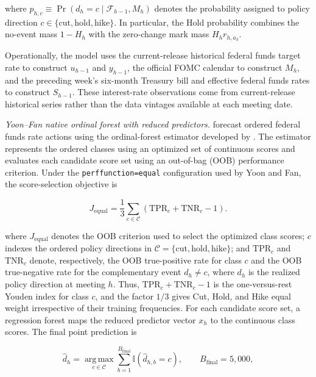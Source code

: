 where
\(p_{h,c}\equiv\Pr(d_h=c\mid\mathcal{F}_{h-1},M_h)\) denotes the probability
assigned to policy direction
\(c\in\{\mathrm{cut},\mathrm{hold},\mathrm{hike}\}\). In particular, the Hold
probability combines the no-event mass \(1-H_h\) with the zero-change mark
mass \(H_h r_{h,a_3}\).

Operationally, the model uses the current-release historical federal funds
target rate to construct \(u_{h-1}\) and \(y_{h-1}\), the official FOMC
calendar to construct \(M_h\), and the preceding week's six-month Treasury
bill and effective federal funds rates to construct \(S_{h-1}\). These
interest-rate observations come from current-release historical series rather
than the data vintages available at each meeting date.

\noindent\textit{Yoon--Fan native ordinal forest with reduced predictors.}
\citet{yoonfan2024forecasting} forecast ordered federal funds rate actions
using the ordinal-forest estimator developed by
\citet{hornung2020ordinalforests}. The estimator represents the ordered
classes using an optimized set of continuous scores and evaluates each
candidate score set using an out-of-bag (OOB) performance criterion. Under
the \texttt{perffunction=equal} configuration used by Yoon and Fan, the
score-selection objective is

\begin{equation}
    J_{\mathrm{equal}}
    =
    \frac{1}{3}
    \sum_{c\in\mathcal{C}}
    \left(
        \mathrm{TPR}_{c}
        +\mathrm{TNR}_{c}
        -1
    \right).
    \label{eq:ch2:decision_ordinal_forest_equal}
\end{equation}

where \(J_{\mathrm{equal}}\) denotes the OOB criterion used to select the
optimized class scores; \(c\) indexes the ordered policy directions in
\(\mathcal{C}=\{\mathrm{cut},\mathrm{hold},\mathrm{hike}\}\); and
\(\mathrm{TPR}_{c}\) and \(\mathrm{TNR}_{c}\) denote, respectively, the OOB
true-positive rate for class \(c\) and the OOB true-negative rate for the
complementary event \(d_h\neq c\), where \(d_h\) is the realized policy
direction at meeting \(h\). Thus,
\(\mathrm{TPR}_{c}+\mathrm{TNR}_{c}-1\) is the one-versus-rest Youden index
for class \(c\), and the factor \(1/3\) gives Cut, Hold, and Hike equal
weight irrespective of their training frequencies. For each candidate score
set, a regression forest maps the reduced predictor vector \(x_h\) to the
continuous class scores. The final point prediction is

\begin{equation}
    \widehat d_h
    =
    \operatorname*{arg\,max}_{c\in\mathcal{C}}
    \sum_{b=1}^{B_{\mathrm{final}}}
    \mathbb{I}\!\left(\widehat d_{h,b}=c\right),
    \qquad
    B_{\mathrm{final}}=5{,}000,
    \label{eq:ch2:decision_ordinal_forest_vote}
\end{equation}

